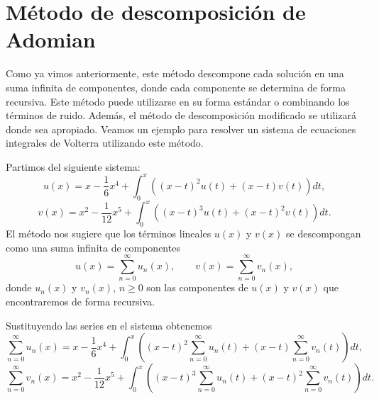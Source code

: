 \section{Método de descomposición de Adomian}
Como ya vimos anteriormente, este método descompone cada solución en una suma infinita de componentes, donde cada componente se determina de forma recursiva. Este método puede utilizarse en su forma estándar o combinando los términos de ruido. Además, el método de descomposición modificado se utilizará donde sea apropiado. Veamos un ejemplo para resolver un sistema de ecuaciones integrales de Volterra utilizando este método.
\begin{ejemplo}
	Partimos del siguiente sistema:
	\begin{equation}
		u(x) = x - \dfrac{1}{6}x^4 + \int_{0}^{x}((x-t)^2u(t) + (x-t)v(t))dt,
	\end{equation}
	\begin{equation}
		v(x) = x^2 - \dfrac{1}{12}x^5 + \int_{0}^{x}((x-t)^3u(t) + (x-t)^2v(t))dt.
	\end{equation}
	El método nos sugiere que los términos lineales $u(x)$ y $v(x)$ se descompongan como una suma infinita de componentes
	\begin{equation}
		u(x) = \sum_{n=0}^{\infty}u_n(x), \qquad v(x) = \sum_{n=0}^{\infty}v_n(x),
	\end{equation}
	donde $u_n(x)$ y $v_n(x)$, $n \geqslant 0$ son las componentes de $u(x)$ y $v(x)$ que encontraremos de forma recursiva.
	
	Sustituyendo las series en el sistema obtenemos
	\begin{equation}
		\sum_{n=0}^{\infty}u_n(x) = x - \dfrac{1}{6}x^4 + \int_{0}^{x}((x-t)^2\sum_{n=0}^{\infty}u_n(t) + (x-t)\sum_{n=0}^{\infty}v_n(t))dt,
	\end{equation}
	\begin{equation}
		\sum_{n=0}^{\infty}v_n(x) = x^2 - \dfrac{1}{12}x^5 + \int_{0}^{x}((x-t)^3\sum_{n=0}^{\infty}u_n(t) + (x-t)^2\sum_{n=0}^{\infty}v_n(t))dt.
	\end{equation}
	

\end{ejemplo}
